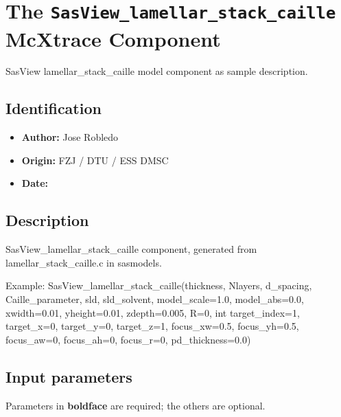 \section{The \texttt{SasView\_lamellar\_stack\_caille} McXtrace Component}
SasView lamellar\_stack\_caille model component as sample description.

\subsection*{Identification}
\begin{itemize}
  \item \textbf{Author:} Jose Robledo
  \item \textbf{Origin:} FZJ / DTU / ESS DMSC
  \item \textbf{Date:} 
\end{itemize}

\subsection*{Description}
SasView\_lamellar\_stack\_caille component, generated from lamellar\_stack\_caille.c in sasmodels.

Example: SasView\_lamellar\_stack\_caille(thickness, Nlayers, d\_spacing, Caille\_parameter, sld, sld\_solvent, model\_scale=1.0, model\_abs=0.0, xwidth=0.01, yheight=0.01, zdepth=0.005, R=0, int target\_index=1, target\_x=0, target\_y=0, target\_z=1, focus\_xw=0.5, focus\_yh=0.5, focus\_aw=0, focus\_ah=0, focus\_r=0, pd\_thickness=0.0)

\subsection*{Input parameters}
Parameters in \textbf{boldface} are required; the others are optional.

